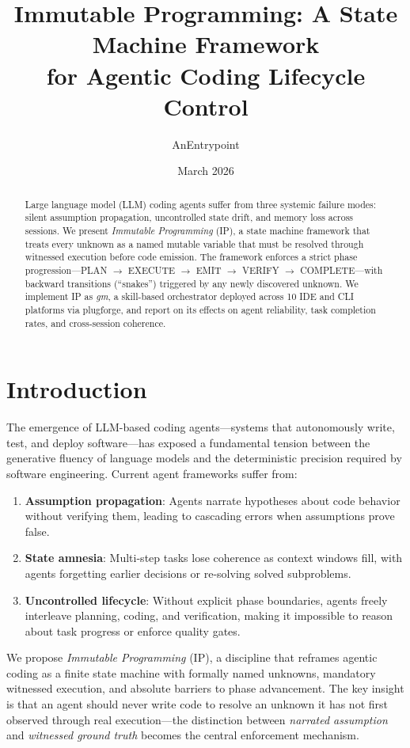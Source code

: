 \documentclass[11pt,twocolumn]{article}
\title{Immutable Programming: A State Machine Framework\\for Agentic Coding Lifecycle Control}
\author{AnEntrypoint}
\date{March 2026}
\begin{document}
\maketitle

\begin{abstract}
Large language model (LLM) coding agents suffer from three systemic failure modes: silent assumption propagation, uncontrolled state drift, and memory loss across sessions. We present \emph{Immutable Programming} (IP), a state machine framework that treats every unknown as a named mutable variable that must be resolved through witnessed execution before code emission. The framework enforces a strict phase progression---PLAN $\to$ EXECUTE $\to$ EMIT $\to$ VERIFY $\to$ COMPLETE---with backward transitions (``snakes'') triggered by any newly discovered unknown. We implement IP as \emph{gm}, a skill-based orchestrator deployed across 10 IDE and CLI platforms via plugforge, and report on its effects on agent reliability, task completion rates, and cross-session coherence.
\end{abstract}

\section{Introduction}

The emergence of LLM-based coding agents---systems that autonomously write, test, and deploy software---has exposed a fundamental tension between the generative fluency of language models and the deterministic precision required by software engineering. Current agent frameworks suffer from:

\begin{enumerate}[nosep]
    \item \textbf{Assumption propagation}: Agents narrate hypotheses about code behavior without verifying them, leading to cascading errors when assumptions prove false.
    \item \textbf{State amnesia}: Multi-step tasks lose coherence as context windows fill, with agents forgetting earlier decisions or re-solving solved subproblems.
    \item \textbf{Uncontrolled lifecycle}: Without explicit phase boundaries, agents freely interleave planning, coding, and verification, making it impossible to reason about task progress or enforce quality gates.
\end{enumerate}

We propose \emph{Immutable Programming} (IP), a discipline that reframes agentic coding as a finite state machine with formally named unknowns, mandatory witnessed execution, and absolute barriers to phase advancement. The key insight is that an agent should never write code to resolve an unknown it has not first observed through real execution---the distinction between \emph{narrated assumption} and \emph{witnessed ground truth} becomes the central enforcement mechanism.
\end{document}
